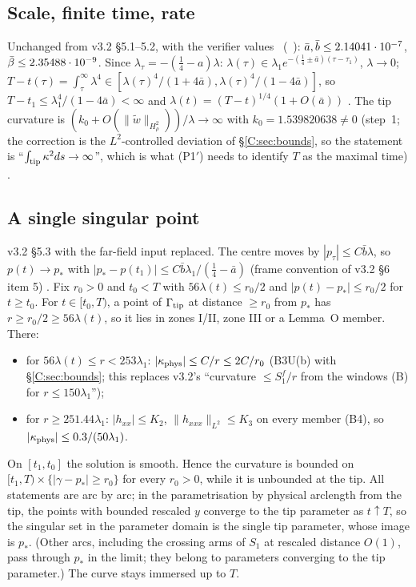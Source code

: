 \documentclass[11pt]{article}
\begin{document}
\subsection{Scale, finite time, rate}
Unchanged from v3.2 \S5.1--5.2, with the  verifier values \tC\ (\SV\ ): $\bar a,\bar b\le2.14041\cdot10^{-7}$, $\bar\beta\le2.35488\cdot10^{-9}$. Since $\lambda_\tau=-(\frac14-a)\lambda$: $\lambda(\tau)\in\lambda_1e^{-(\frac14\pm\bar a)(\tau-\tau_1)}$, $\lambda\to0$; $T-t(\tau)=\int_\tau^\infty\lambda^4\in[\lambda(\tau)^4/(1+4\bar a),\lambda(\tau)^4/(1-4\bar a)]$, so $T-t_1\le\lambda_1^4/(1-4\bar a)<\infty$ and $\lambda(t)=(T-t)^{1/4}(1+O(\bar a))$ \tP. The tip curvature is $(k_0+O(\|\tilde w\|_{H^2_\rho}))/\lambda\to\infty$ with $k_0=1.539820638\ne0$ (step~1; the correction is the $L^2$-controlled deviation of \S\ref{C:sec:bounds}, so the statement is ``$\int_{\rm tip}\kappa^2ds\to\infty$'', which is what (P1$'$) needs to identify $T$ as the maximal time) \tP.

\subsection{A single singular point}\label{C:sec:point}
v3.2 \S5.3 with the far-field input replaced. The centre moves by $|p_\tau|\le C\bar b\lambda$, so $p(t)\to p_*$ with $|p_*-p(t_1)|\le C\bar b\lambda_1/(\frac14-\bar a)$ (frame convention of v3.2 \S6 item 5) \tP. Fix $r_0>0$ and $t_0<T$ with $56\lambda(t)\le r_0/2$ and $|p(t)-p_*|\le r_0/2$ for $t\ge t_0$. For $t\in[t_0,T)$, a point of $\Gamma_{\rm tip}$ at distance $\ge r_0$ from $p_*$ has $r\ge r_0/2\ge56\lambda(t)$, so it lies in zones I/II, zone III or a Lemma~O member. There:
\begin{itemize}[leftmargin=*]
\item for $56\lambda(t)\le r<253\lambda_1$: $|\kappa_{\rm phys}|\le C/r\le2C/r_0$ (B3U(b) with \S\ref{C:sec:bounds}; this replaces v3.2's ``curvature $\le S_1^f/r$ from the windows (B) for $r\le150\lambda_1$'');
\item for $r\ge251.44\lambda_1$: $|h_{xx}|\le K_2$, $\|h_{xxx}\|_{L^2}\le K_3$ on every member (B4), so $|\kappa_{\rm phys}|\le0.3/(50\lambda_1)$.
\end{itemize}
On $[t_1,t_0]$ the solution is smooth. Hence the curvature is bounded on $[t_1,T)\times\{|\gamma-p_*|\ge r_0\}$ for every $r_0>0$, while it is unbounded at the tip. All statements are arc by arc; in the parametrisation by physical arclength from the tip, the points with bounded rescaled $y$ converge to the tip parameter as $t\uparrow T$, so the singular set in the parameter domain is the single tip parameter, whose image is $p_*$. (Other arcs, including the crossing arms of $S_1$ at rescaled distance $O(1)$, pass through $p_*$ in the limit; they belong to parameters converging to the tip parameter.) The curve stays immersed up to $T$.
\end{document}
